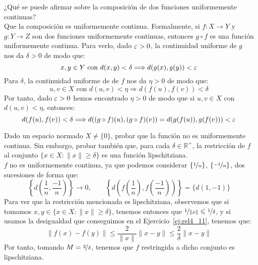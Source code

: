     \begin{ejercicio}
    ¿Qué se puede afirmar sobre la composición de dos funciones uniformemente continuas?\\

    \noindent
    Que la composición es uniformemente continua. Formalmente, si $f:X\to Y$ y $g:Y\to Z$ son dos funciones uniformemente continuas, entonces $g\circ f$ es una función uniformemente continua. Para verlo, dado $\veps > 0$, la continuidad uniforme de $g$ nos da $\delta>0$ de modo que:
    \begin{equation*}
        x,y\in Y \text{\ con\ } d(x,y) < \delta \Longrightarrow d(g(x),g(y)) < \veps
    \end{equation*}
    Para $\delta$, la continuidad uniforme de de $f$ nos da $\eta > 0$ de modo que:
    \begin{equation*}
        u,v\in X \text{\ con\ } d(u,v) < \eta \Longrightarrow d(f(u),f(v)) < \delta
    \end{equation*}
    Por tanto, dado $\veps > 0$ hemos encontrado $\eta>0$ de modo que si $u,v\in X$ con $d(u,v) < \eta$, entonces:
    \begin{equation*}
        d(f(u), f(v)) < \delta \Longrightarrow d((g\circ f)(u), (g\circ f)(v)) = d(g(f(u)), g(f(v))) < \veps
    \end{equation*}
    \end{ejercicio}
    
    \begin{ejercicio}
    Dado un espacio normado \( X \neq \{0\} \), probar que la función
    no es uniformemente continua. Sin embargo, probar también que, para cada \( \delta \in \mathbb{R}^+ \), la restricción de \( f \) al conjunto \( \{ x \in X : \|x\| \geq \delta \} \) es una función lipschitziana.\\

    \noindent
    $f$ no es uniformemente continua, ya que podemos considerar $\{\nicefrac{1}{n}\}$, $\{\nicefrac{-1}{n}\}$, dos sucesiones de forma que:
    \begin{equation*}
        \left\{d\left(\dfrac{1}{n}, \dfrac{-1}{n}\right) \right\}\to 0, \qquad \left\{d\left(f\left(\dfrac{1}{n}\right), f\left(\dfrac{-1}{n}\right)\right)\right\} = \{d(1,-1)\} 
    \end{equation*}
    Para ver que la restricción mencionada es lipschitziana, observemos que si tomamos $x,y\in \{x\in X:\|x\| \geq \delta\}$, tenemos entonces que $\nicefrac{1}{\|x\|}\leq \nicefrac{1}{\delta}$, y si usamos la desigualdad que conseguimos en el Ejercicio~\ref{ej:rel4_11}, tenemos que:
    \begin{equation*}
        \|f(x) - f(y)\| \leq \dfrac{2}{\|x\|}\|x-y\| \leq \dfrac{2}{\delta}\|x-y\|
    \end{equation*}
    Por tanto, tomando $M = \nicefrac{2}{\delta}$, tenemos que $f$ restringida a dicho conjunto es lipschitziana.
    \end{ejercicio}
    
